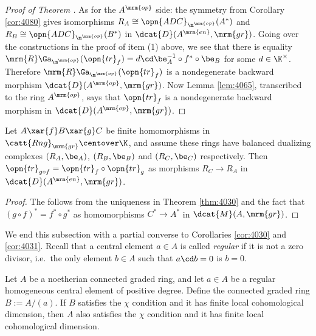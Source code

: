 \begin{proof}[Proof of Theorem \tup{\ref{thm:4030}}]
As for the $A^{\mrm{op}}$ side: the symmetry from Corollary \ref{cor:4080} 
gives isomorphisms 
$R_A \cong \opn{ADC}_{\m^{\mrm{op}}}(A^*)$
and
$R_B \cong \opn{ADC}_{\m^{\mrm{op}}}(B^*)$
in $\dcat{D}(A^{\mrm{en}}, \mrm{gr})$. 
Going over the constructions in the proof of item (1) above, we see that
there is equality 
$\mrm{R} \Ga_{\m^{\mrm{op}}}(\opn{tr}_f) = 
d \cd \be_{A}^{-1} \circ f^* \circ \be_B$
for some $d \in \K^{\times}$.
Therefore $\mrm{R} \Ga_{\m^{\mrm{op}}}(\opn{tr}_f)$ 
is a nondegenerate backward morphism 
$\dcat{D}(A^{\mrm{op}}, \mrm{gr})$.
Now Lemma \ref{lem:4065}, transcribed to the ring $A^{\mrm{op}}$, 
says that $\opn{tr}_f$ is a 
nondegenerate backward morphism in
$\dcat{D}(A^{\mrm{op}}, \mrm{gr})$.
\end{proof}

\begin{cor} \label{cor:4065}
Let $A \xar{f} B \xar{g} C$ be finite homomorphisms in 
$\catt{Rng}_{\mrm{gr}} \centover \K$, 
and assume these rings have balanced dualizing 
complexes $(R_A, \be_A)$, $(R_B, \be_B)$ and $(R_C, \be_C)$
respectively. 
Then 
$\opn{tr}_{g \circ f} = \opn{tr}_f \circ \opn{tr}_g$
as morphisms $R_C \to R_A$ in $\dcat{D}(A^{\mrm{en}}, \mrm{gr})$. 
\end{cor}

\begin{proof}
The follows from the uniqueness in Theorem \ref{thm:4030} and the fact that 
$(g \circ f)^* = f^* \circ g^*$ as homomorphisms $C^* \to A^*$ in 
$\dcat{M}(A, \mrm{gr})$. 
\end{proof}

We end this subsection with a partial converse to Corollaries 
\ref{cor:4030} and \ref{cor:4031}.
Recall that a central element $a \in A$ is called {\em regular} if it is not a 
zero divisor, i.e.\ the only element $b \in A$ such that $a \cd b = 0$ is 
$b = 0$. 

\begin{thm} \label{thm:4250}
Let $A$ be a noetherian connected graded ring, and let $a \in A$ be a regular
homogeneous central element of positive degree. Define the connected graded 
ring $B := A / (a)$. If $B$ satisfies the $\chi$ condition and it has finite 
local cohomological dimension, then $A$ also  satisfies the $\chi$ condition 
and it has finite local cohomological dimension.
\end{thm}

